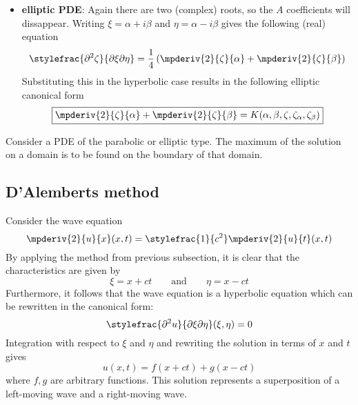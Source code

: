 {\begin{itemize}
            \item \textbf{elliptic PDE}: Again there are two (complex) roots, so the $A$ coefficients will dissappear. Writing $\xi = \alpha + i\beta$ and $\eta = \alpha - i\beta$ gives the following (real) equation
            \[
            	\stylefrac{\partial^2\zeta}{\partial\xi\partial\eta} = \frac{1}{4}\left(\mpderiv{2}{\zeta}{\alpha} + \mpderiv{2}{\zeta}{\beta}\right)
            \]
            Substituting this in the hyperbolic case results in the following elliptic canonical form
            \begin{equation}
				\label{pde:elliptic_canonical_form}
                \boxed{\mpderiv{2}{\zeta}{\alpha} + \mpderiv{2}{\zeta}{\beta} = K(\alpha,\beta,\zeta,\zeta_\alpha,\zeta_\beta)}
			\end{equation}
		\end{itemize}
    }
    
    \begin{theorem}
    	\label{pde:theorem:maximum_principle}
		Consider a PDE of the parabolic or elliptic type. The maximum of the solution on a domain is to be found on the boundary of that domain. 
	\end{theorem}
    
\subsection{D'Alemberts method}

	Consider the wave equation
    \begin{equation}
    	\label{pde:wave_equation}
		\mpderiv{2}{u}{x}(x, t) = \stylefrac{1}{c^2}\mpderiv{2}{u}{t}(x, t)
	\end{equation}
    By applying the method from previous subsection, it is clear that the characteristics are given by
    \begin{equation}
		\xi = x + ct\qquad\text{and}\qquad \eta = x - ct
	\end{equation}
    Furthermore, it follows that the wave equation is a hyperbolic equation which can be rewritten in the canonical form:
    \begin{equation}
		\label{pde:canonical_wave_equation}
        \stylefrac{\partial^2u}{\partial\xi\partial\eta}(\xi,\eta) = 0
	\end{equation}
    Integration with respect to $\xi$ and $\eta$ and rewriting the solution in terms of $x$ and $t$ gives
    \begin{equation}
    	\label{pde:wave_solution}
		u(x, t) = f(x+ct) + g(x-ct)
	\end{equation}
    where $f, g$ are arbitrary functions. This solution represents a superposition of a left-moving wave and a right-moving wave.\par
    
